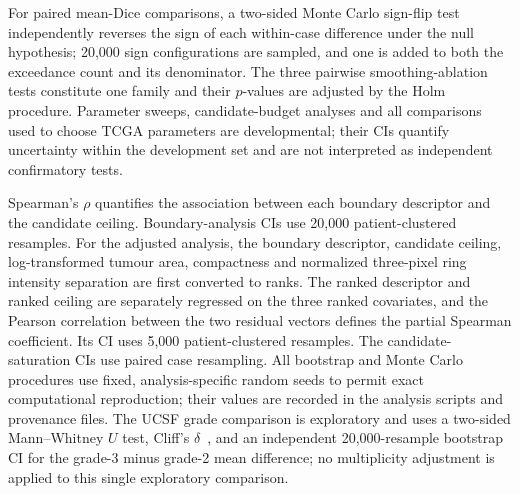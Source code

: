 \documentclass[11pt,a4paper]{article}
\begin{document}
For paired mean-Dice comparisons, a two-sided Monte Carlo sign-flip test
independently reverses the sign of each within-case difference under the null
hypothesis; 20,000 sign configurations are sampled, and one is added to both the
exceedance count and its denominator. The three pairwise smoothing-ablation
tests constitute one family and their $p$-values are adjusted by the Holm
procedure. Parameter sweeps, candidate-budget analyses and all comparisons used
to choose TCGA parameters are developmental; their CIs quantify uncertainty
within the development set and are not interpreted as independent confirmatory
tests.

Spearman's $\rho$ quantifies the association between each boundary descriptor and
the candidate ceiling. Boundary-analysis CIs use 20,000 patient-clustered
resamples. For the adjusted analysis, the boundary descriptor, candidate ceiling,
log-transformed tumour area, compactness and
normalized three-pixel ring intensity separation are first converted to ranks.
The ranked descriptor and ranked ceiling are separately regressed on the three
ranked covariates, and the Pearson correlation between the two residual vectors
defines the partial Spearman coefficient. Its CI uses 5,000 patient-clustered
resamples. The candidate-saturation CIs use paired case resampling. All bootstrap
and Monte Carlo procedures use fixed, analysis-specific random seeds to permit
exact computational reproduction; their values are recorded in the analysis
scripts and provenance files. The UCSF grade comparison is exploratory and uses
a two-sided Mann--Whitney $U$ test, Cliff's $\delta$~\cite{cliff1993}, and an
independent 20,000-resample bootstrap CI for the grade-3 minus grade-2 mean
difference; no multiplicity adjustment is applied to this single exploratory
comparison.
\end{document}
